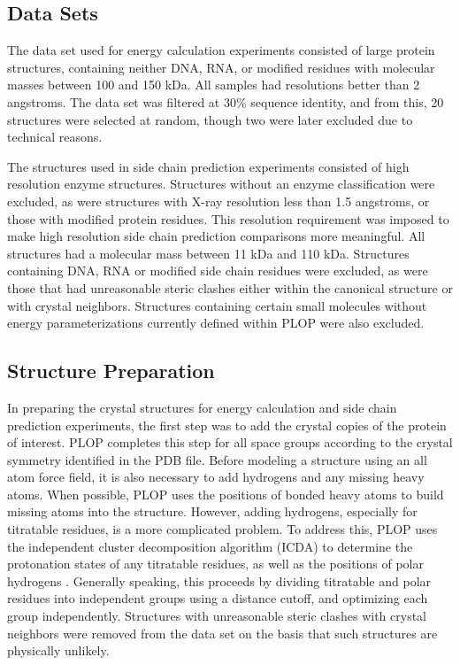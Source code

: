 \subsection*{Data Sets}
\label{subsec:data_sets}
The data set used for energy calculation experiments consisted of large protein structures, containing neither DNA, RNA, or modified residues with molecular masses between 100 and 150 kDa. 
All samples had resolutions better than 2 angstroms. 
The data set was filtered at 30\% sequence identity, and from this, 20 structures were selected at random, though two were later excluded due to technical reasons.

The structures used in side chain prediction experiments consisted of high resolution enzyme structures.
Structures without an enzyme classification were excluded, as were structures with X-ray resolution less than 1.5 angstroms, or those with modified protein residues.
This resolution requirement was imposed to make high resolution side chain prediction comparisons more meaningful.
All structures had a molecular mass between 11 kDa and 110 kDa.
Structures containing DNA, RNA or modified side chain residues were excluded, as were those that had unreasonable steric clashes either within the canonical structure or with crystal neighbors.
Structures containing certain small molecules without energy parameterizations currently defined within PLOP were also excluded.

\subsection*{Structure Preparation}
\label{subsec:structure_preparation}
In preparing the crystal structures for energy calculation and side chain prediction experiments, the first step was to add the crystal copies of the protein of interest.
PLOP completes this step for all space groups according to the crystal symmetry identified in the PDB file.
Before modeling a structure using an all atom force field, it is also necessary to add hydrogens and any missing heavy atoms.
When possible, PLOP uses the positions of bonded heavy atoms to build missing atoms into the structure.
However, adding hydrogens, especially for titratable residues, is a more complicated problem.
To address this, PLOP uses the independent cluster decomposition algorithm (ICDA) to determine the protonation states of any titratable residues, as well as the positions of polar hydrogens \cite{li2007assignment}.
Generally speaking, this proceeds by dividing titratable and polar residues into independent groups using a distance cutoff, and optimizing each group independently.
Structures with unreasonable steric clashes with crystal neighbors were removed from the data set on the basis that such structures are physically unlikely.

